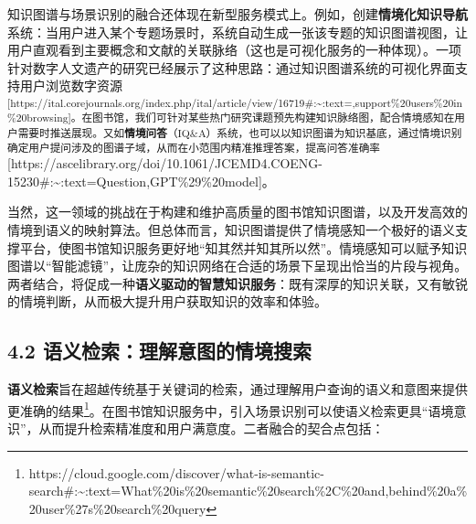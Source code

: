 \documentclass[
  letterpaper,
]{scrbook}
\begin{document}
知识图谱与场景识别的融合还体现在新型服务模式上。例如，创建\textbf{情境化知识导航}系统：当用户进入某个专题场景时，系统自动生成一张该专题的知识图谱视图，让用户直观看到主要概念和文献的关联脉络（这也是可视化服务的一种体现）。一项针对数字人文遗产的研究已经展示了这种思路：通过知识图谱系统的可视化界面支持用户浏览数字资源\textsuperscript{{[}https://ital.corejournals.org/index.php/ital/article/view/16719\#:\textasciitilde:text=,support\%20users\%20in\%20browsing{]}。在图书馆，我们可针对某些热门研究课题预先构建知识脉络图，配合情境感知在用户需要时推送展现。又如\textbf{情境问答}（IQ\&A）系统，也可以以知识图谱为知识基底，通过情境识别确定用户提问涉及的图谱子域，从而在小范围内精准推理答案，提高问答准确率}{[}https://ascelibrary.org/doi/10.1061/JCEMD4.COENG-15230\#:\textasciitilde:text=Question,GPT\%29\%20model{]}。

当然，这一领域的挑战在于构建和维护高质量的图书馆知识图谱，以及开发高效的情境到语义的映射算法。但总体而言，知识图谱提供了情境感知一个极好的语义支撑平台，使图书馆知识服务更好地``知其然并知其所以然''。情境感知可以赋予知识图谱以``智能滤镜''，让庞杂的知识网络在合适的场景下呈现出恰当的片段与视角。两者结合，将促成一种\textbf{语义驱动的智慧知识服务}：既有深厚的知识关联，又有敏锐的情境判断，从而极大提升用户获取知识的效率和体验。

\subsection{4.2
语义检索：理解意图的情境搜索}\label{ux8bedux4e49ux68c0ux7d22ux7406ux89e3ux610fux56feux7684ux60c5ux5883ux641cux7d22}

\textbf{语义检索}旨在超越传统基于关键词的检索，通过理解用户查询的语义和意图来提供更准确的结果\footnote{https://cloud.google.com/discover/what-is-semantic-search\#:\textasciitilde:text=What\%20is\%20semantic\%20search\%2C\%20and,behind\%20a\%20user\%27s\%20search\%20query}。在图书馆知识服务中，引入场景识别可以使语义检索更具``语境意识''，从而提升检索精准度和用户满意度。二者融合的契合点包括：
\end{document}
